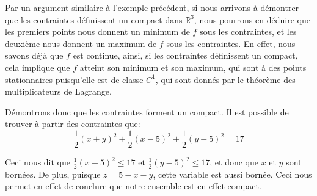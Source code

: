 \documentclass[a4paper]{article}
\begin{document}
{    Par un argument similaire à l'exemple précédent, si nous arrivons à démontrer que les contraintes définissent un compact dans $\mathbb{R}^3$, nous pourrons en déduire que les premiers points nous donnent un minimum de $f$ sous les contraintes, et les deuxième nous donnent un maximum de $f$ sous les contraintes. En effet, nous savons déjà que $f$ est continue, ainsi, si les contraintes définissent un compact, cela implique que $f$ atteint son minimum et son maximum, qui sont à des points stationnaires puisqu'elle est de classe $C^1$, qui sont donnés par le théorème des multiplicateurs de Lagrange.

    Démontrons donc que les contraintes forment un compact. Il est possible de trouver à partir des contraintes que: 
    \[\frac{1}{2}\left(x + y\right)^2 + \frac{1}{2}\left(x - 5\right)^2 + \frac{1}{2}\left(y - 5\right)^2 = 17\]
    
    Ceci nous dit que $\frac{1}{2} \left(x - 5\right)^2 \leq 17$ et $\frac{1}{2}\left(y - 5\right)^2 \leq 17$, et donc que $x$ et $y$ sont bornées. De plus, puisque $z = 5 - x- y$, cette variable est aussi bornée. Ceci nous permet en effet de conclure que notre ensemble est en effet compact.
}
\end{document}
